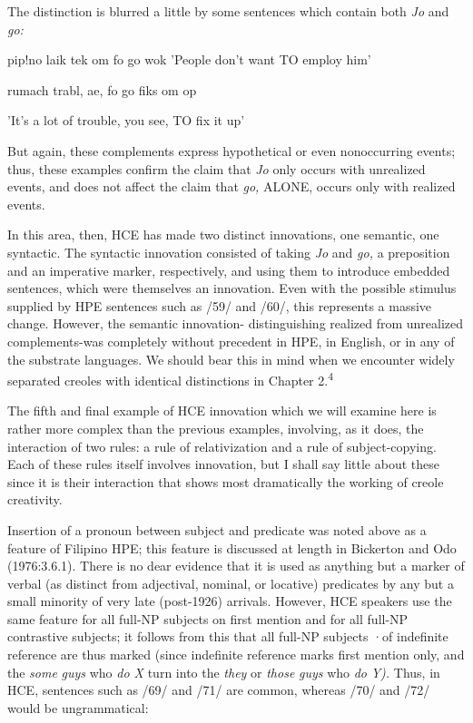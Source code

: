The distinction is blurred a little by some sentences which contain both \textit{Jo} and \textit{go:}

\ea\label{ex:67}
 pip!no laik tek om fo go wok 'People don't want TO employ him'
\glt
\z

\ea\label{ex:68}
 rumach trabl, ae, fo go fiks om op
\glt
\z

'It's a lot of trouble, you see, TO fix it up'

But again, these complements express hypothetical or even nonoccur\-ring events; thus, these examples confirm the claim that \textit{Jo} only occurs with unrealized events, and does not affect the claim that \textit{go,} ALONE, occurs only with realized events.

In this area, then, HCE has made two distinct innovations, one semantic, one syntactic. The syntactic innovation consisted of taking \textit{Jo} and \textit{go,} a preposition and an imperative marker, respectively, and using them to introduce embedded sentences, which were themselves an innovation. Even with the possible stimulus supplied by HPE sen\-tences such as /59/ and /60/, this represents a massive change. However, the semantic innovation- distinguishing realized from unrealized com\-plements-was completely without precedent in HPE, in English, or in any of the substrate languages. We should bear this in mind when we encounter widely separated creoles with identical distinctions in Chapter 2.\textsuperscript{4}

The fifth and final example of HCE innovation which we will examine here is rather more complex than the previous examples, involving, as it does, the interaction of two rules: a rule of relativization and a rule of subject-copying. Each of these rules itself involves inno\-vation, but I shall say little about these since it is their interaction that shows most dramatically the working of creole creativity.

  


 


Insertion of a pronoun between subject and predicate was noted above as a feature of Filipino HPE; this feature is discussed at length in Bickerton and Odo (1976:3.6.1). There is no dear evidence that it is used as anything but a marker of verbal (as distinct from adjectival, nominal, or locative) predicates by any but a small minority of very late (post-1926) arrivals. However, HCE speakers use the same feature for all full-NP subjects on first mention and for all full-NP contrastive subjects; it follows from this that all full-NP subjects ·of indefinite refer\-ence are thus marked (since indefinite reference marks first mention only, and the \textit{some} \textit{guys} who \textit{do X }turn into the \textit{they} or \textit{those} \textit{guys }who \textit{do} \textit{Y}\textit{).} Thus, in HCE, sentences such as /69/ and /71/ are common, whereas /70/ and /72/ would be ungrammatical:

